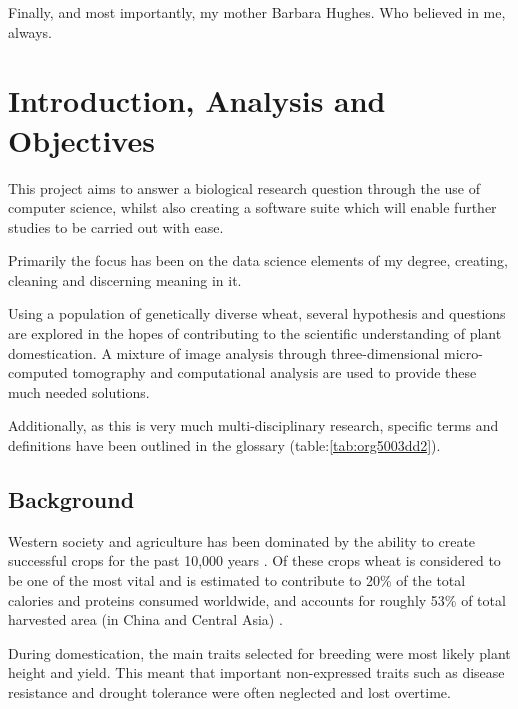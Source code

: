 \documentclass[11pt]{report}
\begin{document}
\vspace{1cm}

Finally, and most importantly, my mother Barbara Hughes. Who believed in me, always.



  \clearpage
  \tableofcontents
  \clearpage
  \listoftables
  \clearpage
  \listoffigures
  \clearpage
  \listofmyequations
  \clearpage
  \listoflistings
  \clearpage

\chapter{Introduction, Analysis and Objectives}
\label{sec:orgc7c1be5}

This project aims to answer a biological research question through the use of computer science, whilst also creating a software suite which will enable further studies to be carried out with ease.

Primarily the focus has been on the data science elements of my degree, creating, cleaning and discerning meaning in it.

Using a population of genetically diverse wheat, several hypothesis and questions are explored in the hopes of contributing to the scientific understanding of plant domestication. A mixture of image analysis through three-dimensional micro-computed tomography and computational analysis are used to provide these much needed solutions.


Additionally, as this is very much multi-disciplinary research, specific terms and definitions have been outlined in the glossary (table:\ref{tab:org5003dd2}).

\section{Background}
\label{sec:org043198f}

Western society and agriculture has been dominated by the ability to create successful crops for the past 10,000 years \cite{Ozkan2002}. Of these crops wheat is considered to be one of the most vital and is estimated to contribute to 20\% of the total calories and proteins consumed worldwide, and accounts for roughly 53\% of total harvested area (in China and Central Asia) \cite{Shiferaw2013}.

During domestication, the main traits selected for breeding were most likely plant height and yield. This meant that important non-expressed traits such as disease resistance and drought tolerance were often neglected and lost overtime.
\end{document}
